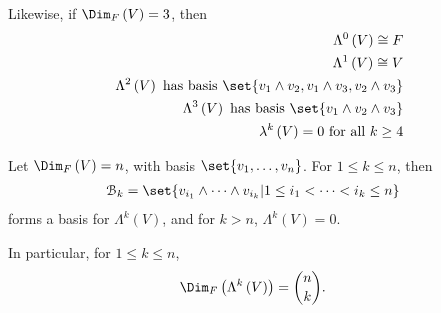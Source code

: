 \documentclass[10pt]{mypackage}
\begin{document}
\begin{example}
    Likewise, if $\Dim_{F}\left(V\right) = 3 $, then
    \begin{align*}
      \Lambda^{0}\left(V\right) \cong F\\
      \Lambda^{1}\left(V\right) \cong V\\
      \Lambda^{2}\left(V\right)\text{ has basis } \set{v_1\wedge v_2, v_1\wedge v_3,v_2\wedge v_3}\\
      \Lambda^{3}\left(V\right)\text{ has basis } \set{v_1\wedge v_2\wedge v_3}\\
      \lambda^{k}\left(V\right) = 0 \text{ for all $k \geq 4$}
    \end{align*}
    
  \end{example}
    \begin{theorem}
      Let $\Dim_{F}\left(V\right) = n$, with basis $\set{v_1,\dots,v_n}$. For $1 \leq k \leq n$, then
      \begin{align*}
        \mathcal{B}_{k} &= \set{v_{i_1}\wedge\cdots\wedge v_{i_k} | 1 \leq i_1 < \cdots < i_k \leq n}
      \end{align*}
      forms a basis for $\Lambda^{k}\left(V\right)$, and for $k > n$, $\Lambda^{k}\left(V\right) = 0$.\newline

      In particular, for $1 \leq k \leq n$,
      \begin{align*}
        \Dim_{F}\left(\Lambda^{k}\left(V\right)\right) &= {n\choose k}.
      \end{align*}
    \end{theorem}
\end{document}
